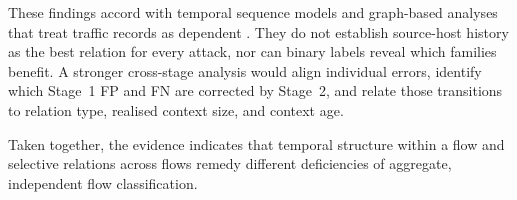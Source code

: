 \documentclass[11pt,fleqn]{report}
\begin{document}
These findings accord with temporal sequence models and graph-based analyses that treat traffic records as dependent \cite{LiuPatras2022NetSentry,Deng2023FlowTopology,Xu2024SSLGNN}. They do not establish source-host history as the best relation for every attack, nor can binary labels reveal which families benefit. A stronger cross-stage analysis would align individual errors, identify which Stage~1 FP and FN are corrected by Stage~2, and relate those transitions to relation type, realised context size, and context age.

Taken together, the evidence indicates that temporal structure within a flow and selective relations across flows remedy different deficiencies of aggregate, independent flow classification.


\end{document}
